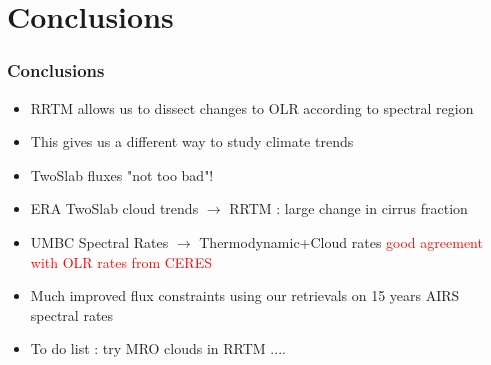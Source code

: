 \documentclass[10pt,t]{beamer}
\begin{document}
\section{Conclusions}
\begin{frame}
  \frametitle{Conclusions}
  \begin{itemize}
  \item RRTM allows us to dissect changes to OLR according to spectral region
  \item This gives us a different way to study climate trends
  \item TwoSlab fluxes "not too bad"!
  \item ERA TwoSlab cloud trends $\rightarrow$ RRTM : large change in cirrus fraction
  \item UMBC Spectral Rates $\rightarrow$ Thermodynamic+Cloud rates \textcolor{red}{good agreement
        with OLR rates from CERES}
  \item Much improved flux constraints using our retrievals on 15 years AIRS spectral rates
  \item To do list : try MRO clouds in RRTM ....
  \end{itemize}
\end{frame}
\end{document}
